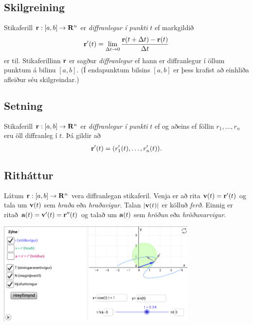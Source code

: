 \documentclass[a4paper,10pt,icelandic]{sphinxmanual}
\begin{document}
\subsection{Skilgreining}
\label{Kafli1:id2}\label{Kafli1:index-2}
Stikaferill
\(\mbox{${\bf r}$}:  [a,b]\rightarrow \mbox{${\bf R}^n$}\) er
\emph{diffranlegur í punkti} \(t\) ef markgildið
\begin{gather}
\begin{split}\displaystyle \mbox{${\bf r}$}'(t)=\lim_{\Delta t\rightarrow 0}\frac{\mbox{${\bf r}$}(t+\Delta t)-\mbox{${\bf r}$}(t)}{\Delta t}\end{split}\notag
\end{gather}
er til. Stikaferillinn \(\mbox{${\bf r}$}\) er sagður \emph{diffranlegur}
ef hann er diffranlegur í öllum punktum á bilinu \([a,b]\). (Í
endapunktum bilsins \([a,b]\) er þess krafist að einhliða afleiður
séu skilgreindar.)


\subsection{Setning}
\label{Kafli1:setning}
Stikaferill
\(\mbox{${\bf r}$}:  [a,b]\rightarrow \mbox{${\bf R}^n$}\) er
\emph{diffranlegur í punkti} \(t\) ef og aðeins ef föllin
\(r_1,\ldots,r_n\) eru öll diffranleg í \(t\). Þá gildir að
\begin{gather}
\begin{split}\displaystyle \mbox{${\bf r}$}'(t)=(r'_1(t),\ldots,r'_n(t)).\end{split}\notag
\end{gather}

\subsection{Ritháttur}
\label{Kafli1:index-3}\label{Kafli1:id3}
Látum \(\mbox{${\bf r}$}:  [a,b]\rightarrow \mbox{${\bf R}^n$}\)
vera diffranlegan stikaferil. Venja er að rita
\(\mbox{${\bf v}$}(t)=\mbox{${\bf r}$}'(t)\) og tala um
\(\mbox{${\bf v}$}(t)\) sem \textit{hraða} eða \emph{hraðavigur}. Talan
\(|\mbox{${\bf v}$}(t)|\) er kölluð \textit{ferð}. Einnig er ritað
\(\mbox{${\bf a}$}(t)=\mbox{${\bf v}$}'(t)=\mbox{${\bf r}$}''(t)\)
og talað um \(\mbox{${\bf a}$}(t)\) sem \textit{hröðun} eða
\emph{hröðunarvigur}.


\begin{center}
\includegraphics[width=10cm,keepaspectratio=true]{stikaferill.png}
\end{center}
\end{document}
